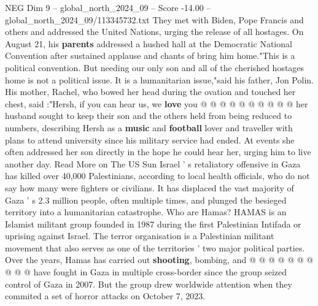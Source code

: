 \begin{textsample}{NEG Dim 9 – global\_north\_2024\_09 – Score -14.00 – global\_north\_2024\_09/113345732.txt}
They met with Biden, Pope Francis and others and addressed the United Nations, urging the release of all hostages.
On August 21, his \textbf{parents} addressed a hushed hall at the Democratic National Convention after sustained applause and chants of bring him home."This is a political convention.
But needing our only son and all of the cherished hostages home is not a political issue.
It is a humanitarian issue,"said his father, Jon Polin.
His mother, Rachel, who bowed her head during the ovation and touched her chest, said :"Hersh, if you can hear us, we \textbf{love} you @ @ @ @ @ @ @ @ @ @ her husband sought to keep their son and the others held from being reduced to numbers, describing Hersh as a \textbf{music} and \textbf{football} lover and traveller with plans to attend university since his military service had ended.
At events she often addressed her son directly in the hope he could hear her, urging him to live another day.
Read More on The US Sun Israel ' s retaliatory offensive in Gaza has killed over 40,000 Palestinians, according to local health officials, who do not say how many were fighters or civilians.
It has displaced the vast majority of Gaza ' s 2.3 million people, often multiple times, and plunged the besieged territory into a humanitarian catastrophe.
Who are Hamas?
HAMAS is an Islamist militant group founded in 1987 during the first Palestinian Intifada or uprising against Israel.
The terror organisation is a Palestinian militant movement that also serves as one of the territories ' two major political parties.
Over the years, Hamas has carried out \textbf{shooting}, bombing, and @ @ @ @ @ @ @ @ @ @ have fought in Gaza in multiple cross-border since the group seized control of Gaza in 2007.
But the group drew worldwide attention when they commited a set of horror attacks on October 7, 2023.

\end{textsample}
